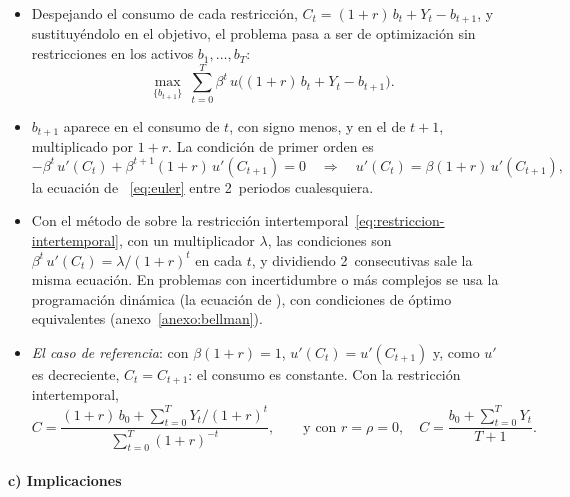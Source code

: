 \documentclass[11pt]{article}
\begin{document}
\begin{itemize}
\item Despejando el consumo de cada restricción, $C_t=(1+r)\,b_t+Y_t-b_{t+1}$, y sustituyéndolo en el objetivo, el problema pasa a ser de optimización sin restricciones en los activos $b_1,\dots,b_{T}$:
  \begin{equation*}
  \max_{\{b_{t+1}\}}\ \sum_{t=0}^{T}\beta^t\,u\big((1+r)\,b_t+Y_t-b_{t+1}\big).
  \end{equation*}
\item $b_{t+1}$ aparece en el consumo de $t$, con signo menos, y en el de $t+1$, multiplicado por $1+r$. La condición de primer orden es
  \begin{equation*}
  -\beta^t\,u'(C_t)+\beta^{t+1}(1+r)\,u'(C_{t+1})=0\quad\Longrightarrow\quad u'(C_t)=\beta(1+r)\,u'(C_{t+1}),
  \end{equation*}
  la ecuación de ~\eqref{eq:euler} entre 2~periodos cualesquiera.
\item Con el método de  sobre la restricción intertemporal~\eqref{eq:restriccion-intertemporal}, con un multiplicador $\lambda$, las condiciones son $\beta^t\,u'(C_t)=\lambda/(1+r)^t$ en cada $t$, y dividiendo 2~consecutivas sale la misma ecuación. En problemas con incertidumbre o más complejos se usa la programación dinámica (la ecuación de ), con condiciones de óptimo equivalentes (anexo~\ref{anexo:bellman}).
\item \emph{El caso de referencia}: con $\beta(1+r)=1$, $u'(C_t)=u'(C_{t+1})$ y, como $u'$ es decreciente, $C_t=C_{t+1}$: el consumo es constante. Con la restricción intertemporal,
  \begin{equation*}
  C=\frac{(1+r)\,b_0+\sum_{t=0}^{T}Y_t/(1+r)^t}{\sum_{t=0}^{T}(1+r)^{-t}},\qquad\text{y con }r=\rho=0,\quad C=\frac{b_0+\sum_{t=0}^{T}Y_t}{T+1}.
  \end{equation*}
  \findemo
\end{itemize}

\paragraph{c) Implicaciones}
\end{document}
